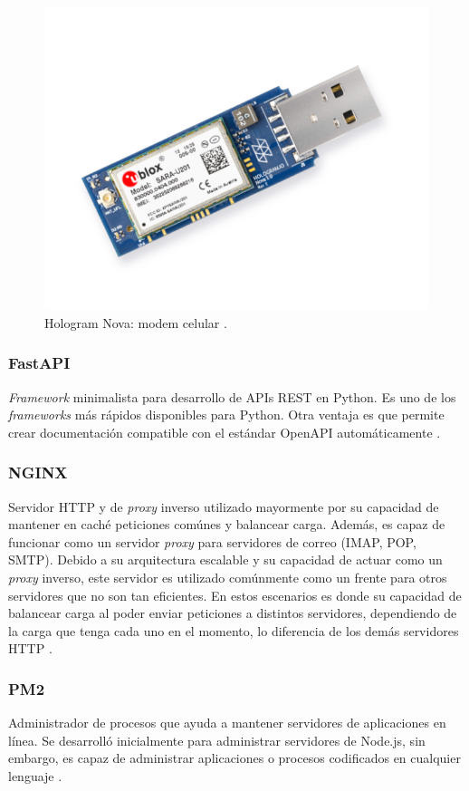 \begin{figure}[!ht]
    \centering
    \includegraphics[width=.50\linewidth]{imagenes/hologram_nova_usb.png}
    \caption{Hologram Nova: modem celular \cite{hologram_nova}.}
    \label{fig:hologram_nova}
\end{figure}

\subsubsection{FastAPI}
\textit{Framework} minimalista para desarrollo de APIs REST en Python. Es uno de los \textit{frameworks} más rápidos disponibles para Python. Otra ventaja es que permite crear documentación compatible con el estándar OpenAPI automáticamente \cite{fastapi}.

\subsubsection{NGINX}
Servidor HTTP y de \textit{proxy} inverso utilizado mayormente por su capacidad de mantener en caché peticiones comúnes y balancear carga. Además, es capaz de funcionar como un servidor \textit{proxy} para servidores de correo (IMAP, POP, SMTP). Debido a su arquitectura escalable y su capacidad de actuar como un \textit{proxy} inverso, este servidor es utilizado comúnmente como un frente para otros servidores que no son tan eficientes. En estos escenarios es donde su capacidad de balancear carga al poder enviar peticiones a distintos servidores, dependiendo de la carga que tenga cada uno en el momento, lo diferencia de los demás servidores HTTP \cite{nginx}.

\subsubsection{PM2}
Administrador de procesos que ayuda a mantener servidores de aplicaciones en línea. Se desarrolló inicialmente para administrar servidores de Node.js, sin embargo, es capaz de administrar aplicaciones o procesos codificados en cualquier lenguaje \cite{pm2_landing}.

